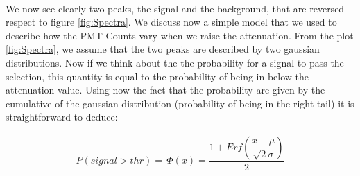 \begin{figure}[!ht]
\centering
{}
\\
\end{figure}

We now see clearly two peaks, the signal and the background, that are reversed respect to figure \ref{fig:Spectra}.
We discuss now a simple model that we used to describe how the PMT Counts vary when we raise the attenuation. From the plot \ref{fig:Spectra}, we assume that the two peaks are described by two gaussian distributions. Now if we think about the the probability for a signal to pass the selection, this quantity is equal to the probability of being in below the attenuation value. Using now the fact that the probability are given by the cumulative of the gaussian distribution (probability of being in the right tail) it is straightforward to deduce:

\begin{align*}
P(signal > thr) = \, \Phi(x) = \dfrac{1 + Erf(\dfrac{x - \mu}{\sqrt{2} \sigma })}{2}
\end{align*}

